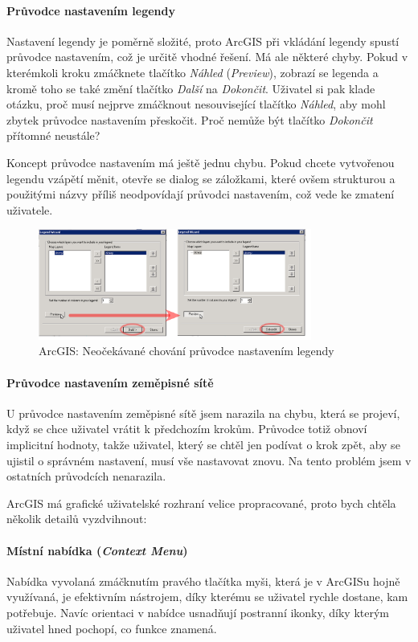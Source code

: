 \documentclass[a4paper,12pt,draft]{article}
\begin{document}
{\paragraph*{Průvodce nastavením legendy}  Nastavení legendy je poměrně
složité, proto ArcGIS při vkládání legendy spustí průvodce nastavením,
což je určitě vhodné řešení. Má ale některé chyby. Pokud v
kterémkoli kroku zmáčknete tlačítko \emph{Náhled} (\emph{Preview}),
zobrazí se legenda a kromě toho se také změní tlačítko \emph{Další}
na \emph{Dokončit}. Uživatel si pak klade otázku, proč musí nejprve
zmáčknout nesouvisející tlačítko \emph{Náhled}, aby mohl zbytek
průvodce nastavením přeskočit. Proč nemůže být tlačítko
\emph{Dokončit} přítomné neustále?

Koncept průvodce nastavením má ještě jednu chybu. Pokud chcete vytvořenou
legendu vzápětí měnit, otevře se dialog se záložkami, které ovšem
strukturou a použitými názvy příliš neodpovídají průvodci nastavením,
což vede ke zmatení uživatele.

\begin{figure}[h!]
\centering
\includegraphics[width=0.8\textwidth]{./GUI_screenshots/ArcGIS_legend_wizard.png}
\caption{ArcGIS: Neočekávané chování průvodce nastavením legendy}
\label{fig:ArcGIS_legend_wizard}
\end{figure}


\paragraph*{Průvodce nastavením zeměpisné sítě}
U průvodce nastavením zeměpisné sítě jsem narazila na chybu, která se
projeví, když se chce uživatel vrátit k předchozím krokům. Průvodce
totiž obnoví implicitní hodnoty, takže uživatel, který se chtěl jen
podívat o krok zpět, aby se ujistil o správném nastavení, musí vše
nastavovat znovu. Na tento problém jsem v ostatních průvodcích nenarazila.

ArcGIS má grafické uživatelské rozhraní velice propracované, proto
bych chtěla několik detailů vyzdvihnout:
\paragraph*{Místní nabídka (\emph{Context Menu})}
Nabídka vyvolaná zmáčknutím pravého tlačítka myši, která je v ArcGISu
hojně využívaná, je efektivním nástrojem, díky kterému se uživatel
rychle dostane, kam potřebuje. Navíc orientaci v nabídce usnadňují
postranní ikonky, díky kterým uživatel hned pochopí, co funkce znamená.

}
\end{document}
